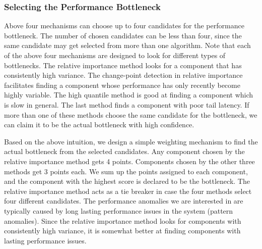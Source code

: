 \subsubsection{Selecting the Performance Bottleneck}
Above four mechanisms can choose up to four candidates for the performance bottleneck. The number of
chosen candidates can be less than four, since the same candidate may get selected from more than
one algorithm. Note that each of the above four mechanisms are designed to look for different
types of bottlenecks. The relative importance method looks for a component that has consistently
high variance. The change-point detection in relative importance
facilitates finding a component whose
performance has only recently become highly variable. The high quantile method is good at
finding a component which is slow in general. The last method finds a component with poor
tail latency. If more than one of these methods choose the same candidate for the bottleneck,
we can claim it to be the actual bottleneck with high confidence.

Based on the above intuition, we design a simple weighting mechanism to find the actual
bottleneck from the selected candidates. Any component chosen by the relative importance
method gets 4 points. Components chosen by the other three methods get 3 points each. 
We sum up the points assigned to each component, and the component with the highest
score is declared to be the bottleneck. The relative importance method acts as a tie breaker
in case the four methods select four different candidates. The performance anomalies we
are interested in are typically caused by long lasting performance issues in the system 
(pattern anomalies). Since the relative importance method looks for components with
consistently high variance, it is somewhat better at finding components
with lasting performance issues.